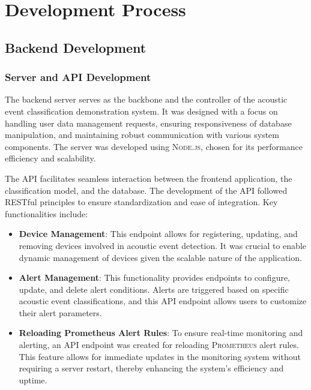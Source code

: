 \section{Development Process}

\subsection{Backend Development}
\subsubsection{Server and API Development}

The backend server serves as the backbone and the controller of the acoustic event classification demonstration system. It was designed with a focus on handling user data management requests, ensuring responsiveness of database manipulation, and maintaining robust communication with various system components. The server was developed using \textsc{Node.js}, chosen for its performance efficiency and scalability.

The API facilitates seamless interaction between the frontend application, the classification model, and the database. The development of the API followed RESTful principles to ensure standardization and ease of integration. Key functionalities include:

\begin{itemize}
  \item \textbf{Device Management}: This endpoint allows for registering, updating, and removing devices involved in acoustic event detection. It was crucial to enable dynamic management of devices given the scalable nature of the application.
  \item \textbf{Alert Management}: This functionality provides endpoints to configure, update, and delete alert conditions. Alerts are triggered based on specific acoustic event classifications, and this API endpoint allows users to customize their alert parameters.
  \item \textbf{Reloading Prometheus Alert Rules}: To ensure real-time monitoring and alerting, an API endpoint was created for reloading \textsc{Prometheus} alert rules. This feature allows for immediate updates in the monitoring system without requiring a server restart, thereby enhancing the system’s efficiency and uptime.
\end{itemize}

